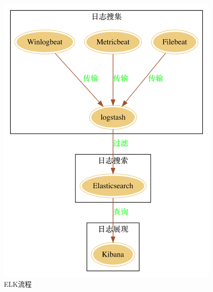\documentclass[8pt]{book}
\numberwithin{dummy}{section}
\theoremstyle{ocrenumbox}
\theoremstyle{blacknumex}
\theoremstyle{blacknumbox}
\theoremstyle{ocrenum}
\begin{document}
\begin{figure}[htbp]
	\centering
	\includegraphics[scale=0.05]{elk-log-architecture.jpg}
	\caption{ELK流程}
	\label{fig:elklogarchitecture}
\end{figure}
\end{document}
